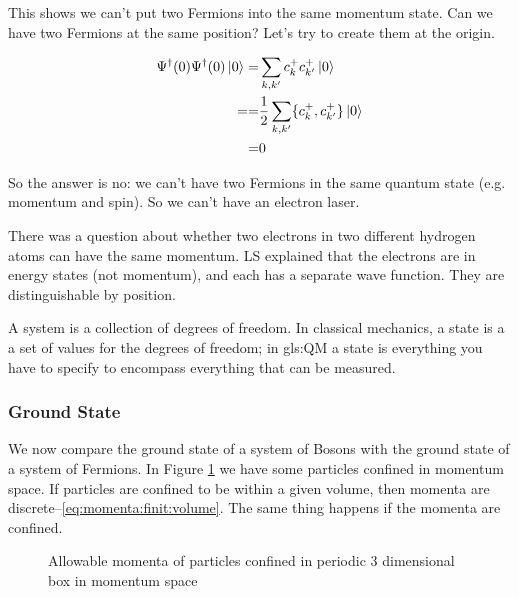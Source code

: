 \documentclass[]{article}
\begin{document}
This shows we can't put two Fermions into the same momentum state. Can we have two Fermions at the same position? Let's try to create them at the origin.

\begin{align*}
	\Psi^\dagger(0) \Psi^\dagger(0) \ket{0} =& \sum_{k,k^\prime} c^+_k c^+_{k^\prime} \ket{0}\\
	==& \frac{1}{2} \sum_{k,k^\prime} \{c^+_k, c^+_{k^\prime}\} \ket{0}\\
	=& 0
\end{align*}

So the answer is no: we can't have two Fermions in the same quantum state (e.g. momentum and spin). So we can't have an electron laser.

There was a question about whether two electrons in two different hydrogen atoms can have the same momentum. LS explained that the electrons are in energy states (not momentum), and each has a separate wave function. They are distinguishable by position.

A system is a collection of degrees of freedom. In classical mechanics, a state is a a set of values for the degrees of freedom; in \glsdesc{gls:QM} a state is everything you have to specify to encompass everything that can be measured.

\subsubsection{Ground State}
We now compare the ground state of a system of Bosons with the ground state of a system of Fermions. In Figure \ref{fig:electons:confined:momentum} we have some particles confined in momentum space. If particles are confined to be within a given volume, then momenta are discrete--\eqref{eq:momenta:finit:volume}. The same thing happens if the momenta are confined.

\begin{figure}[H]
	\begin{center}
		\caption[Particles confined in momentum space]{Allowable momenta of particles confined in periodic 3 dimensional box in momentum space}\label{fig:electons:confined:momentum}
	\end{center}
\end{figure}
\end{document}
